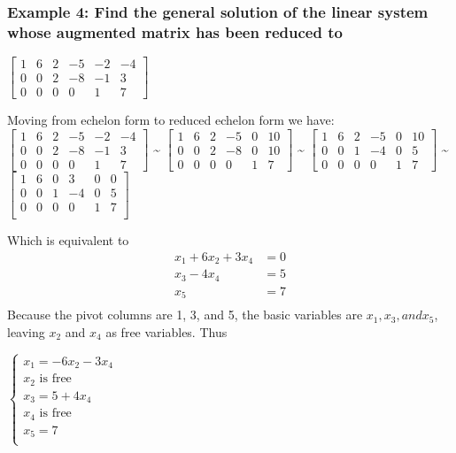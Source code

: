 \documentclass[12pt]{article} %
\begin{document}
\subsubsection{Example 4: Find the general solution of the linear system whose augmented matrix has been reduced to}
\begin{center}
	$\begin{bmatrix}
		1 & 6 & 2 & -5 & -2 & -4\\
		0 & 0 & 2 & -8 & -1 & 3\\
		0 & 0 & 0 & 0 & 1 & 7
	\end{bmatrix}$
\end{center}
Moving from echelon form to reduced echelon form we have:\\

$\begin{bmatrix}
	1 & 6 & 2 & -5 & -2 & -4\\
	0 & 0 & 2 & -8 & -1 & 3\\
	0 & 0 & 0 & 0 & 1 & 7
\end{bmatrix}$
\textasciitilde 
$\begin{bmatrix}
	1 & 6 & 2 & -5 & 0 & 10\\
	0 & 0 & 2 & -8 & 0 & 10\\
	0 & 0 & 0 & 0 & 1 & 7
\end{bmatrix}$
\textasciitilde 
$\begin{bmatrix}
	1 & 6 & 2 & -5 & 0 & 10\\
	0 & 0 & 1 & -4 & 0 & 5\\
	0 & 0 & 0 & 0 & 1 & 7
\end{bmatrix}$
\textasciitilde
$\begin{bmatrix}
	1 & 6 & 0 & 3 & 0 & 0\\
	0 & 0 & 1 & -4 & 0 & 5\\
	0 & 0 & 0 & 0 & 1 & 7\\
\end{bmatrix}$



Which is equivalent to 
\begin{align*}
	x_1 + 6x_2 + 3x_4 &= 0\\
	x_3 - 4x_4 &= 5 \\
	x_5 &= 7\\
\end{align*}
Because the pivot columns are 1, 3, and 5, the basic variables are $x_1, x_3, and x_5$, leaving $x_2$ and $x_4$ as free variables. Thus
\begin{center}
	$\begin{cases}
		x_1 = -6x_2 - 3x_4\\
		x_2 \text{ is free}\\
		x_3 = 5 + 4x_4\\
		x_4 \text{ is free}\\
		x_5 = 7\\
	\end{cases}$
\end{center}
\end{document}
